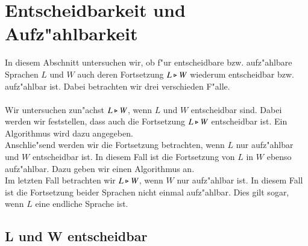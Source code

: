 \section{Entscheidbarkeit und Aufz"ahlbarkeit}
In diesem Abschnitt untersuchen wir, ob f"ur entscheidbare bzw. aufz"ahlbare Sprachen $L$ und $W$ auch deren Fortsetzung $L\triangleright W$ wiederum entscheidbar bzw. aufz"ahlbar ist. Dabei betrachten wir drei verschieden F"alle.\\\\
Wir untersuchen zun"achst $L\triangleright W$, wenn $L$ und $W$ entscheidbar sind. Dabei werden wir feststellen, dass auch die Fortsetzung $L\triangleright W$ entscheidbar ist. Ein Algorithmus wird dazu angegeben.\\
Anschlie"send werden wir die Fortsetzung betrachten, wenn $L$ nur aufz"ahlbar und $W$ entscheidbar ist. In diesem Fall ist die Fortsetzung von $L$ in $W$ ebenso aufz"ahlbar. Dazu geben wir einen Algorithmus an.\\
Im letzten Fall betrachten wir $L\triangleright W$, wenn $W$ nur aufz"ahlbar ist. In diesem Fall ist die Fortsetzung beider Sprachen nicht einmal aufz"ahlbar. Dies gilt sogar, wenn $L$ eine endliche Sprache ist.
\subsection{L und W entscheidbar}

